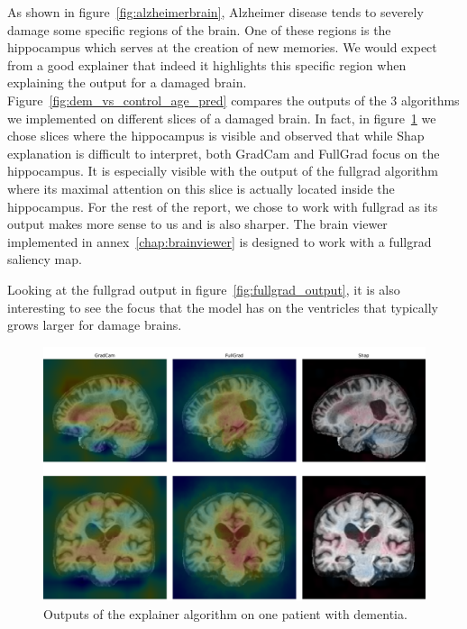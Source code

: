 As shown in figure~\ref{fig:alzheimerbrain}, Alzheimer disease tends to severely damage some specific regions of the brain. One of these regions is the hippocampus which serves at the creation of new memories. We would expect from a good explainer that indeed it highlights this specific region when explaining the output for a damaged brain. Figure~\ref{fig:dem_vs_control_age_pred} compares the outputs of the 3 algorithms we implemented on different slices of a damaged brain. In fact, in figure~\ref{fig:explainer_compared} we chose slices where the hippocampus is visible and observed that while Shap explanation is difficult to interpret, both GradCam and FullGrad focus on the hippocampus. It is especially visible with the output of the fullgrad algorithm where its maximal attention on this slice is actually located inside the hippocampus. For the rest of the report, we chose to work with fullgrad as its output makes more sense to us and is also sharper. The brain viewer implemented in annex~\ref{chap:brainviewer} is designed to work with a fullgrad saliency map.

Looking at the fullgrad output in figure~\ref{fig:fullgrad_output}, it is also interesting to see the focus that the model has on the ventricles that typically grows larger for damage brains. 



\begin{figure}
    \centering
    \includegraphics[width=0.9\linewidth]{figures/Experiements/explainer_coparaison.pdf}
    \caption{Outputs of the explainer algorithm on one patient with dementia.}
    \label{fig:explainer_compared}
\end{figure}

